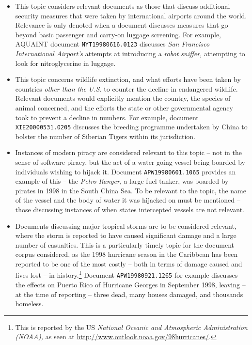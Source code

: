 \begin{itemize}
    
    \item{ This topic considers relevant documents as those that discuss additional security measures that were taken by international airports around the world. Relevance is only denoted when a document discusses measures that go beyond basic passenger and carry-on luggage screening. For example, AQUAINT document \texttt{NYT19980616.0123} discusses \emph{San Francisco International Airport's} attempts at introducing a \emph{robot sniffer,} attempting to look for nitroglycerine in luggage.}
    
    \item{ This topic concerns wildlife extinction, and what efforts have been taken by countries \emph{other than the U.S.} to counter the decline in endangered wildlife. Relevant documents would explicitly mention the country, the species of animal concerned, and the efforts the state or other governmental agency took to prevent a decline in numbers. For example, document \texttt{XIE20000531.0205} discusses the breeding programme undertaken by China to bolster the number of Siberian Tigers within its jurisdiction.}
    
    \item{ Instances of modern piracy are considered relevant to this topic -- not in the sense of software piracy, but the act of a water going vessel being boarded by individuals wishing to hijack it. Document \texttt{APW19980601.1065} provides an example of this -- the \emph{Petro Ranger}, a large fuel tanker, was boarded by pirates in 1998 in the South China Sea. To be relevant to the topic, the name of the vessel and the body of water it was hijacked on must be mentioned -- those discussing instances of when states intercepted vessels are not relevant.}
    
    \item{ Documents discussing major tropical storms are to be considered relevant, where the storm is reported to have caused significant damage and a large number of casualties. This is a particularly timely topic for the document corpus considered, as the 1998 hurricane season in the Caribbean has been reported to be one of the most costly -- both in terms of damage caused and lives lost -- in history.\footnote{This is reported by the US \emph{National Oceanic and Atmospheric Administration (NOAA),} as seen at \url{http://www.outlook.noaa.gov/98hurricanes/}. } Document \texttt{APW19980921.1265} for example discusses the effects on Puerto Rico of Hurricane Georges in September 1998, leaving -- at the time of reporting -- three dead, many houses damaged, and thousands homeless.}
    

\end{itemize}
